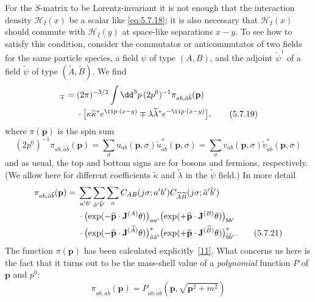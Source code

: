 For the $S$-matrix to be Lorentz-invariant it is not enough that the
interaction density $\mathcal H_I(x)$ be a scalar like \eqref{eq:5.7.18}; it is also
necessary that $\mathcal H_I(x)$ should commute with $\mathcal H_I(y)$ at
space-like separations $x-y$. To see how to satisfy this condition, consider
the commutator or anticommutator of two fields for the same particle species,
a field $\psi$ of type $(A,B)$, and the adjoint $\widetilde\psi^\dagger$ of a
field $\widetilde\psi$ of type $(\widetilde A,\widetilde B)$. We find
\begin{align}
[\psi_{ab}(x),\widetilde\psi^\dagger_{\tilde a\tilde b}(y)]_\mp
={}&(2\pi)^{-3/2}\int \dd^3p\,(2p^0)^{-1}
\pi_{ab,\tilde a\tilde b}(\mathbf p)
\notag\\
&\cdot\bigl[\kappa\widetilde\kappa^*e^{\ii p\cdot(x-y)}
\mp\lambda\widetilde\lambda^*e^{-\ii p\cdot(x-y)}\bigr],
\tag{5.7.19}\label{eq:5.7.19}
\end{align}
where $\pi(\mathbf p)$ is the spin sum
\begin{equation}
(2p^0)^{-1}\pi_{ab,\tilde a\tilde b}(\mathbf p)
=\sum_\sigma u_{ab}(\mathbf p,\sigma)
\widetilde u^*_{\tilde a\tilde b}(\mathbf p,\sigma)
=\sum_\sigma v_{ab}(\mathbf p,\sigma)
\widetilde v^*_{\tilde a\tilde b}(\mathbf p,\sigma)
\tag{5.7.20}\label{eq:5.7.20}
\end{equation}
and as usual, the top and bottom signs are for bosons and fermions,
respectively. (We allow here for different coefficients $\widetilde\kappa$ and
$\widetilde\lambda$ in the $\widetilde\psi$ field.) In more detail
\begin{align}
\pi_{ab,\tilde a\tilde b}(\mathbf p)={}&
\sum_{a'b'}\sum_{\tilde a'\tilde b'}\sum_\sigma
C_{AB}(j\sigma;a'b')C_{\widetilde A\widetilde B}
(j\sigma;\tilde a'\tilde b')
\notag\\
&\cdot\bigl(\exp(-\widehat{\mathbf p}\cdot\mathbf J^{(A)}\theta)\bigr)_{aa'}
\bigl(\exp(+\widehat{\mathbf p}\cdot\mathbf J^{(B)}\theta)\bigr)_{bb'}
\notag\\
&\cdot\bigl(\exp(-\widehat{\mathbf p}\cdot\mathbf J^{(\widetilde A)}\theta)\bigr)^*_{\tilde a\tilde a'}
\bigl(\exp(+\widehat{\mathbf p}\cdot\mathbf J^{(\widetilde B)}\theta)\bigr)^*_{\tilde b\tilde b'}.
\tag{5.7.21}\label{eq:5.7.21}
\end{align}
The function $\pi(\mathbf p)$ has been calculated explicitly~\hyperref[ref:5.11]{[11]}. What
concerns us here is the fact that it turns out to be the mass-shell value of a
\emph{polynomial} function $P$ of $\mathbf p$ and $p^0$:
\begin{equation}
\pi_{ab,\tilde a\tilde b}(\mathbf p)=
P_{ab,\tilde a\tilde b}(\mathbf p,\sqrt{\mathbf p^2+m^2})
\tag{5.7.22}\label{eq:5.7.22}
\end{equation}
